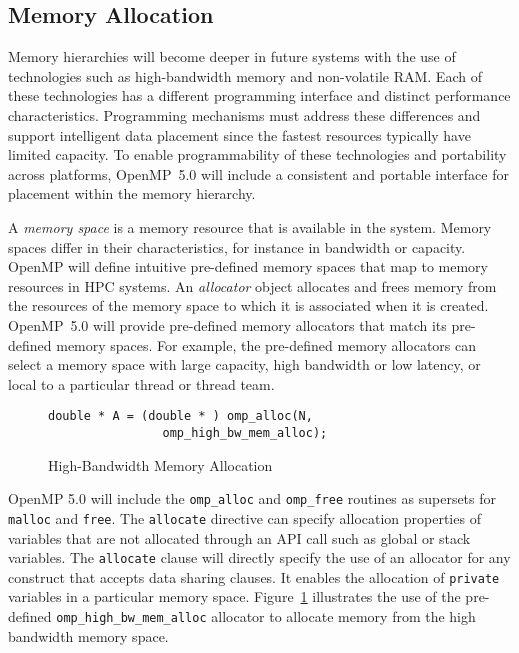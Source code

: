 \subsection{Memory Allocation}
\label{sub:allocators_and_hierarchical_memory}

Memory hierarchies will become deeper in future systems with the use of 
technologies such as high-bandwidth memory and non-volatile RAM. Each 
of these technologies has a different programming interface and distinct
performance characteristics. Programming mechanisms must address these 
differences and support intelligent data placement since the fastest resources
typically have limited capacity. To enable programmability of these 
technologies and portability across platforms, OpenMP~5.0 will include a 
consistent and portable interface for placement within the memory hierarchy.

A \emph{memory space} is a memory resource that is available in the system.
Memory spaces differ in their characteristics, for instance in bandwidth or 
capacity. OpenMP will define intuitive pre-defined memory spaces that map to 
memory resources in HPC systems. An \emph{allocator} object allocates and 
frees memory from the resources of the memory space to which it is associated 
when it is created. OpenMP~5.0 will provide pre-defined memory allocators that
match its pre-defined memory spaces. For example, the pre-defined memory 
allocators can select a memory space with large capacity, high bandwidth or 
low latency, or local to a particular thread or thread team.

\begin{figure}
\begin{verbatim}
double * A = (double * ) omp_alloc(N, 
                omp_high_bw_mem_alloc);
\end{verbatim}
\caption{High-Bandwidth Memory Allocation\label{fig:allocators}}
\end{figure}

OpenMP 5.0 will include the \texttt{omp\_alloc} and \texttt{omp\_free} 
routines as supersets for \texttt{malloc} and \texttt{free}. The 
\texttt{allocate} directive can specify allocation properties of variables 
that are not allocated through an API call such as global or stack variables. 
The \texttt{allocate} clause will directly specify the use of an allocator 
for any construct that accepts data sharing clauses. It enables the allocation
of \texttt{private} variables in a particular memory space. 
Figure~\ref{fig:allocators} illustrates the use of the pre-defined 
\texttt{omp\_high\_bw\_mem\_alloc} allocator to allocate memory from the 
high bandwidth memory space.


